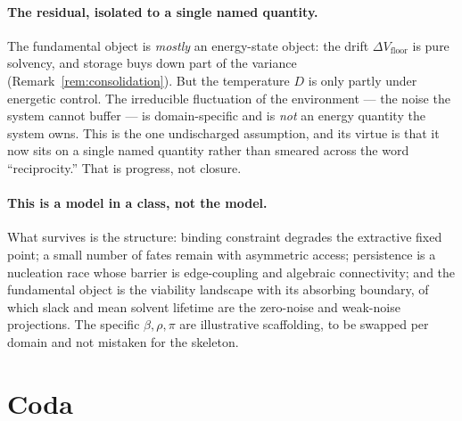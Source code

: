 \documentclass[11pt]{article}
\theoremstyle{plain}
\theoremstyle{definition}
\begin{document}
\paragraph{The residual, isolated to a single named quantity.} The fundamental object is \emph{mostly} an energy-state object: the drift $\Delta V_{\text{floor}}$ is pure solvency, and storage buys down part of the variance (Remark~\ref{rem:consolidation}). But the temperature $D$ is only partly under energetic control. The irreducible fluctuation of the environment --- the noise the system cannot buffer --- is domain-specific and is \emph{not} an energy quantity the system owns. This is the one undischarged assumption, and its virtue is that it now sits on a single named quantity rather than smeared across the word ``reciprocity.'' That is progress, not closure.

\paragraph{This is a model in a class, not the model.} What survives is the structure: binding constraint degrades the extractive fixed point; a small number of fates remain with asymmetric access; persistence is a nucleation race whose barrier is edge-coupling and algebraic connectivity; and the fundamental object is the viability landscape with its absorbing boundary, of which slack and mean solvent lifetime are the zero-noise and weak-noise projections. The specific $\beta,\rho,\pi$ are illustrative scaffolding, to be swapped per domain and not mistaken for the skeleton.

\section{Coda}
\end{document}
